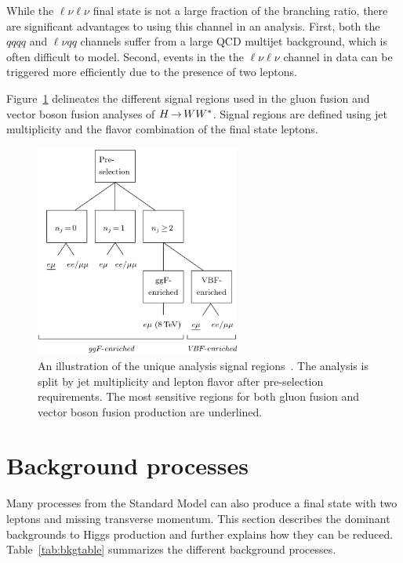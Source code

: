 While the $\ell\nu\ell\nu$ final state is not a large fraction of the branching ratio, there are significant advantages to using this channel in an analysis. First, both the $qqqq$ and $\ell\nu qq$ channels suffer from a large QCD multijet background, which is often difficult to model. Second, events in the the $\ell\nu\ell\nu$ channel in data can be triggered more efficiently due to the presence of two leptons. 

Figure~\ref{fig:analysisregions} delineates the different signal regions used in the gluon fusion and vector boson fusion analyses of $H{\,{\rightarrow}\,}WW^\ast$. Signal regions are defined using jet multiplicity and the flavor combination of the final state leptons. 

\begin{figure}[h!]
  \centering
  \captionsetup{justification=centering}

  \includegraphics[width=0.6\textwidth]{figures/analysis_regions}
  \caption{An illustration of the unique analysis signal regions~\cite{WW2015}. The analysis is split by jet multiplicity and lepton flavor after pre-selection requirements. The most sensitive regions for both gluon fusion and vector boson fusion production are underlined. }
  \label{fig:analysisregions}
\end{figure}

\section{Background processes}

Many processes from the Standard Model can also produce a final state with two leptons and missing transverse momentum. This section describes the dominant backgrounds to Higgs production and further explains how they can be reduced. Table~\ref{tab:bkgtable} summarizes the different background processes. 

